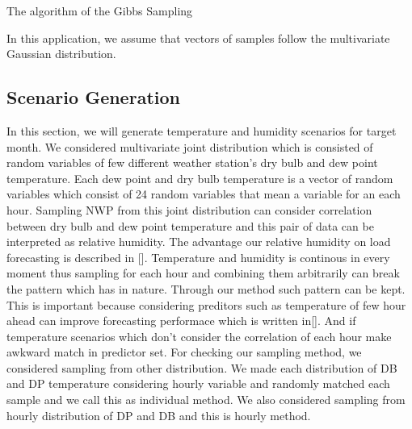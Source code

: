 \documentclass[journal]{IEEEtran} %
\begin{document}
\begin{algorithm}[t!]
\label{Gibbs}
 \caption{The algorithm of the Gibbs Sampling }
\end{algorithm}






 In this application, we assume that vectors of samples follow the multivariate Gaussian distribution.




\subsection{Scenario Generation}

In this section, we will generate temperature and humidity scenarios for target month. We considered multivariate joint distribution which is consisted of random variables of few different weather station's dry bulb and dew point temperature. Each dew point and dry bulb temperature is a vector of random variables which consist of 24 random variables that mean a variable for an each hour. Sampling NWP from this joint distribution can consider correlation between dry bulb and dew point temperature and this pair of data can be interpreted as relative humidity. The advantage our relative humidity on load forecasting is described in []. Temperature and humidity is continous in every moment thus sampling for each hour and combining them arbitrarily can break the pattern which has in nature. Through our method such pattern can be kept. This is important because considering preditors such as temperature of few hour ahead can improve forecasting performace which is written in[]. And if temperature scenarios which don't consider the correlation of each hour make awkward match in predictor set. For checking our sampling method, we considered sampling from other distribution. We made each distribution of DB and DP temperature considering hourly variable and randomly matched each sample and we call this as individual method. We also considered sampling from hourly distribution of DP and DB and this is hourly method. 
\end{document}
